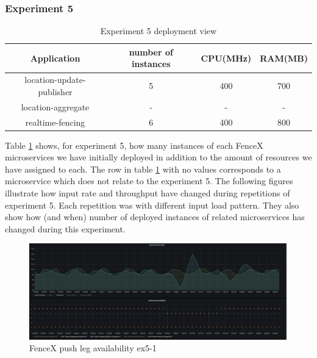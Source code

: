 \documentclass[a4]{report}
\begin{document}
    \subsubsection{Experiment 5}
    \begin{table}[h!]
        \centering
        \begin{tabular}{|c|c|c|c|}
            \hline
            Application               & number of instances & CPU(MHz) & RAM(MB) \\
            \hline
            location-update-publisher & 5                   & 400      & 700     \\
            location-aggregate        & -                   & -        & -       \\
            realtime-fencing          & 6                   & 400      & 800     \\
            \hline
        \end{tabular}
        \caption{Experiment 5 deployment view}
        \label{table:ex5-dv}
    \end{table}

    Table \ref{table:ex5-dv} shows, for experiment 5, how many instances of each FenceX microservices we have initially
    deployed in addition to the amount of resources we have assigned to each.
    The row in table \ref{table:ex5-dv} with no values corresponds to a microservice which does not relate to the
    experiment 5.
    The following figures illustrate how input rate and throughput have changed during repetitions of experiment 5.
    Each repetition was with different input load pattern.
    They also show how (and when) number of deployed instances of related microservices has changed during this
    experiment.

    \begin{figure}[h!]
        \centering
        \caption{FenceX push leg availability ex5-1}
        \label{fig:ex5-1}
        \includegraphics[width=\linewidth, scale=0.4]{images/evaluation/ex5-benchmarking-ongoing-2per6sec.png}
    \end{figure}
\end{document}

